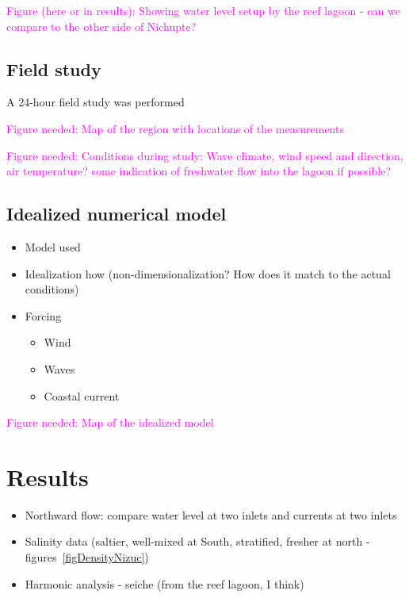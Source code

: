 \documentclass[11pt]{article}
\begin{document}
\textcolor{magenta}{Figure (here or in results): Showing water level setup by the reef lagoon - can we compare to the other side of Nichupte?}

\subsection{Field study}

A 24-hour field study was performed 

\textcolor{magenta}{Figure needed: Map of the region with locations of the measurements}

\textcolor{magenta}{Figure needed: Conditions during study: Wave climate, wind speed and direction, air temperature? some indication of freshwater flow into the lagoon if possible?}


\subsection{Idealized numerical model}

\begin{itemize}
	\item Model used
	\item Idealization how (non-dimensionalization? How does it match to the actual conditions)
	\item Forcing
	\begin{itemize}
		\item Wind
		\item Waves
		\item Coastal current
	\end{itemize}
\end{itemize}

\textcolor{magenta}{Figure needed: Map of the idealized model}


\section{Results}

\begin{itemize}
	\item Northward flow: compare water level at two inlets and currents at two inlets
	\item Salinity data (saltier, well-mixed at South, stratified, fresher at north - figures~\ref{figDensityNizuc})
	\item Harmonic analysis - seiche (from the reef lagoon, I think)
\end{itemize}
\end{document}
